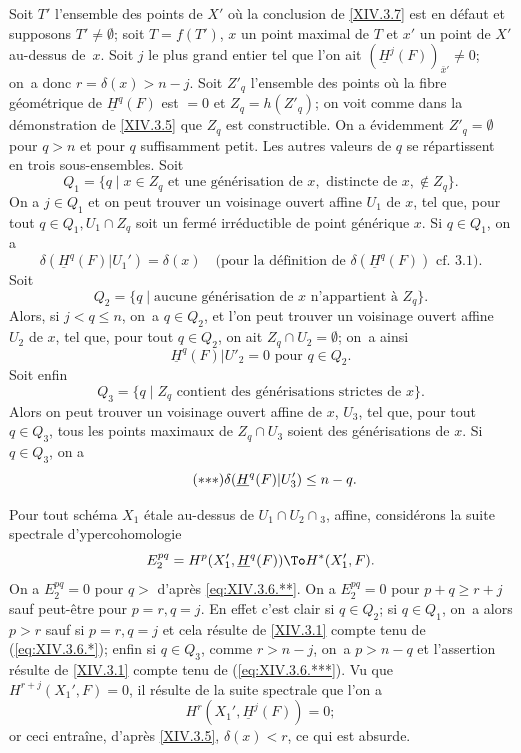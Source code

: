 Soit $T'$ l'ensemble des points de $X'$ o\`u la conclusion de \ref{XIV.3.7} est en d\'efaut et supposons $T' \neq \emptyset$; soit $T=f(T')$, $x$ un point maximal de $T$ et $x'$ un point de $X'$ au-dessus de~$x$. Soit $j$ le plus grand entier tel que l'on ait $(\underline{H}^j(F))_{\bar{x}'} \neq 0$; on~a donc $r=\delta(x)>n-j$. Soit $Z'_q$ l'ensemble des points o\`u la fibre g\'eom\'etrique de $\underline{H}^q(F)$ est $=0$ et $Z_q =h(Z'_q)$; on voit comme dans la d\'emonstration de \ref{XIV.3.5} que $Z_q$ est constructible. On a \'evidemment $Z'_q=\emptyset$ pour $q>n$ et pour $q$ suffisamment petit. Les autres valeurs de $q$ se r\'epartissent en trois sous-ensembles. Soit
$$
Q_1=\{q\mid x\in Z_q\text{ et une générisation de }x, \text{ distincte de }x, \not\in Z_q\}.
$$
On a $j \in Q_1$ et on peut trouver un voisinage ouvert affine $U_1$ de $x$, tel que, pour tout $q \in Q_1, U_1 \cap Z_q$ soit un ferm\'e irr\'eductible de point g\'en\'erique $x$. Si $q \in Q_1$, on a
\begin{equation*} \label{eq:XIV.3.6.*} \tag{$*$} \delta(\underline{H}^q(F){|U_1'})=\delta(x)\quad\text{(pour la définition de $\delta(\underline{H}^q(F))$ cf. 3.1)}.
\end{equation*}
Soit
$$
Q_2=\{q\mid\text{aucune générisation de $x$ n'appartient à }Z_q\}.
$$
Alors, si $j<q\leq n$, on~a $q\in Q_2$, et l'on peut trouver un voisinage ouvert affine $U_2$ de $x$, tel que, pour tout $q \in Q_2$, on ait $Z_q \cap U_2 = \emptyset$; on~a ainsi
\begin{equation*} \label{eq:XIV.3.6.**} \tag{$**$} \underline{H}^q(F){|U'_2}=0\text{ pour }q\in Q_2.
\end{equation*}
Soit enfin
$$
Q_3= \{q\mid Z_q \text{ contient des générisations strictes de }x\}.
$$
Alors on peut trouver un voisinage ouvert affine de $x$, $U_3$, tel que, pour tout $q \in Q_3$, tous les points maximaux de $Z_q \cap U_3$ soient des g\'en\'erisations de $x$. Si $q \in Q_3$, on a
\begin{equation*} \label{eq:XIV.3.6.***} \tag{${*}{*}{*}$} \delta(\underline{H}^q(F){|U'_3})\leq n-q.
\end{equation*}

Pour tout sch\'ema $X_1$ \'etale au-dessus de $U_1 \cap U_2 \cap {}_3$, affine, consid\'erons la suite spectrale d'ypercohomologie
$$
E^{pq}_2= H^p(X_1', \underline{H}^q(F)) \To H^*(X'_1, F).
$$
On a $E^{pq}_2=0$ pour $q>$ d'apr\`es \eqref{eq:XIV.3.6.**}. On a $E^{pq}_2=0$ pour $p+q \geq r+j$ sauf peut-\^etre pour $p=r, q=j$. En effet c'est clair si $q\in Q_2$; si $q\in Q_1$, on~a alors $p>r$ sauf si $p=r, q=j$ et cela r\'esulte de \ref{XIV.3.1} compte tenu de (\ref{eq:XIV.3.6.*}); enfin si $q\in Q_3$, comme $r>n-j$, on~a $p>n-q$ et l'assertion r\'esulte de \ref{XIV.3.1} compte tenu de (\ref{eq:XIV.3.6.***}). Vu que $H^{r+j}(X_1', F)=0$, il r\'esulte de la suite spectrale que l'on a
$$H^r(X_1', \underline{H}^j(F))=0;$$
or ceci entra\^ine, d'apr\`es \ref{XIV.3.5}, $\delta(x)<r$, ce qui est absurde.


